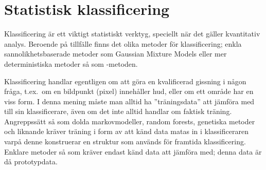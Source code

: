 \documentclass[../rapport_MVEX01-11-05]{subfiles}
\begin{document}
\section{Statistisk klassificering}\label{sec:klassificering}

Klassificering är ett viktigt statistiskt verktyg, speciellt när det gäller
kvantitativ analys. Beroende på tillfälle finns det olika metoder för
klassificering; enkla sannolikhetsbaserade metoder som Gaussian Mixture
Models eller mer deterministiska metoder så som \knn-metoden.

Klassificering handlar egentligen om att göra en kvalificerad gissning
i någon fråga, t.ex.~om en bildpunkt (pixel) innehåller hud, eller om ett område har
en viss form. I denna mening måste man alltid ha ''träningsdata'' att jämföra med
till sin
klassificerare, även om det inte alltid handlar om faktisk träning. Angreppssätt
så som dolda markovmodeller, random forests, genetiska metoder och liknande kräver
träning i form av att känd data matas in i klassificeraren varpå denne
konstruerar en struktur som används för framtida klassificering.
Enklare metoder så som \knn 
kräver endast känd data att jämföra med; denna data är då prototypdata.

\end{document}
